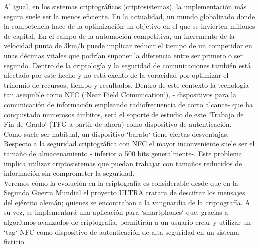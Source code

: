 \documentclass[PFC.tex]{subfiles}
\begin{document}
Al igual, en los sistemas criptográficos (criptosistemas), la implementación más segura suele ser la menos eficiente. En la actualidad, un mundo globalizado donde la competencia  hace de la optimización un objetivo en el que se invierten millones de capital. En el campo de la automoción competitiva, un incremento de la velocidad punta de 3km/h puede implicar reducir el tiempo de un competidor en unas décimas vitales que podrían suponer la diferencia entre ser primero o ser segundo. Dentro de la criptología y la seguridad de comunicaciones también está afectado por este hecho y no está exento de la voracidad por optimizar el trinomio de recursos, tiempo y resultados. Dentro de este contexto la tecnología tan asequible como NFC (`Near Field Comunication`), - dispositivos para la comunicación de información empleando radiofrecuencia de corto alcance- que ha conquistado numerosos ámbitos, será el soporte de estudio de este `Trabajo de Fin de Grado` (TFG a partir de ahora) como dispositivo de autenticación.\\

Como suele ser habitual, un dispositivo `barato` tiene ciertas desventajas. Respecto a la seguridad criptográfica con NFC el mayor inconveniente suele ser el tamaño de almacenamiento - inferior a 500 bits generalmente-. Este problema implica utilizar criptosistemas que puedan trabajar con tamaños reducidos de información sin comprometer la seguridad.\\

Veremos cómo la evolución en la criptografía es considerable desde que en la Segunda Guerra Mundial el proyecto ULTRA tratara de descifrar los mensajes del ejército alemán; quienes se encontraban a la vanguardia de la criptografía. A su vez, se implementará una aplicación para `smartphones` que, gracias a algorítmos avanzados de criptografía, permitirán a un usuario crear y utilizar un `tag` NFC como dispositivo de autenticación de alta seguridad en un sistema ficticio.
\end{document}
